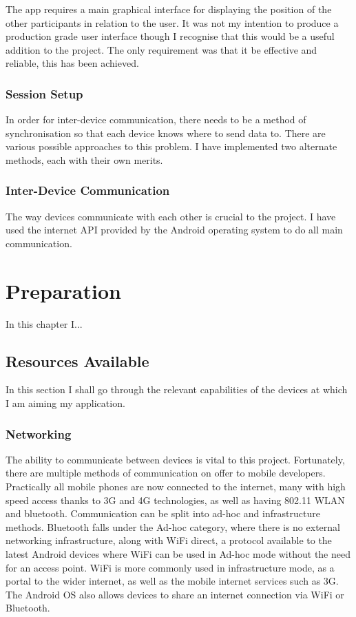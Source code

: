 The app requires a main graphical interface for displaying the position of the other participants in relation to the user. It was not my intention to produce a production grade user interface though I recognise that this would be a useful addition to the project. The only requirement was that it be effective and reliable, this has been achieved.

\subsection{Session Setup}

In order for inter-device communication, there needs to be a method of synchronisation so that each device knows where to send data to. There are various possible approaches to this problem. I have implemented two alternate methods, each with their own merits.

\subsection{Inter-Device Communication}

The way devices communicate with each other is crucial to the project. I have used the internet API provided by the Android operating system to do all main communication.

\cleardoublepage

\chapter{Preparation}

In this chapter I...

\section{Resources Available}

In this section I shall go through the relevant capabilities of the devices at which I am aiming my application.

\subsection{Networking}

The ability to communicate between devices is vital to this project. Fortunately, there are multiple methods of communication on offer to mobile developers.
Practically all mobile phones are now connected to the internet, many with high speed access thanks to 3G and 4G technologies, as well as having 802.11 WLAN and bluetooth.
Communication can be split into ad-hoc and infrastructure methods.
Bluetooth falls under the Ad-hoc category, where there is no external networking infrastructure, along with WiFi direct, a protocol available to the latest Android devices where WiFi can be used in Ad-hoc mode without the need for an access point.
WiFi is more commonly used in infrastructure mode, as a portal to the wider internet, as well as the mobile internet services such as 3G.
The Android OS also allows devices to share an internet connection via WiFi or Bluetooth.

